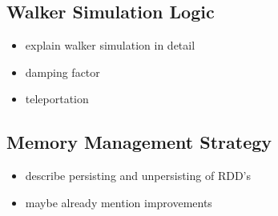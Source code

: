 \subsection{Walker Simulation Logic}
\begin{itemize}
    \item explain walker simulation in detail
    \item damping factor
    \item teleportation
\end{itemize}

\subsection{Memory Management Strategy}
\begin{itemize}
    \item describe persisting and unpersisting of RDD's
    \item maybe already mention improvements
\end{itemize}
